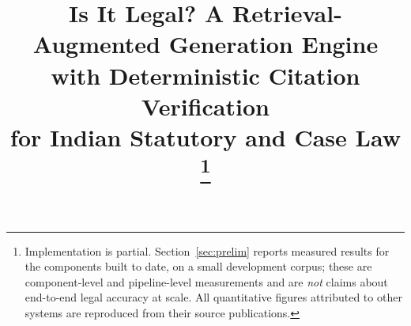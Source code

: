 \documentclass[conference]{IEEEtran}
\begin{document}
\title{Is It Legal? A Retrieval-Augmented Generation Engine\\
with Deterministic Citation Verification\\
for Indian Statutory and Case Law\\
\thanks{Implementation is partial. Section~\ref{sec:prelim} reports measured results for the components built to date, on a small development corpus; these are component-level and pipeline-level measurements and are \emph{not} claims about end-to-end legal accuracy at scale. All quantitative figures attributed to other systems are reproduced from their source publications.}}

\author{
}

\maketitle
\end{document}
